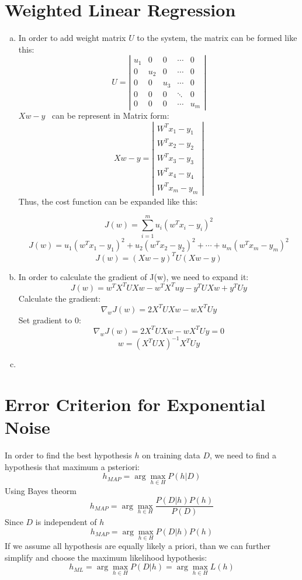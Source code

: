 \documentclass[a4paper, 12pt, titlepage]{article}
\begin{document}
\begin{enumerate}[(a)]
            


\section{Weighted Linear Regression}
\begin{enumerate}[(a)]
    \item In order to add weight matrix $U$ to the system, the matrix can be formed like this:
    \[ U = 
    \left| 
    {\begin{array}{ccccc}
    u_1 & 0 & 0 & \cdots & 0 \\
    0   & u_2 & 0 & \cdots & 0 \\
    0   & 0 & u_3 & \cdots & 0 \\
    0   & 0 & 0 & \ddots & 0 \\
    0   & 0 & 0 & \cdots & u_m
    \end{array}}
    \right|
\]
$Xw-y$~ can be represent in Matrix form:
\[Xw-y=
\left|
{\begin{array}{c}
    W^Tx_1-y_1\\
    W^Tx_2-y_2\\
    W^Tx_3-y_3\\
    W^Tx_4-y_4\\
    W^Tx_m-y_m
\end{array}}
\right|
\]
Thus, the cost function can be expanded like this:

$$J(w)=\sum_{i=1}^mu_i(w^Tx_i-y_i)^2 $$
$$J(w)=u_1(w^Tx_1-y_1)^2+u_2(w^Tx_2-y_2)^2+\cdots+u_m(w^Tx_m-y_m)^2$$
$$J(w)=(Xw-y)^TU(Xw-y)$$
    \item In order to calculate the gradient of J(w), we need to expand it:
        $$J(w)=w^TX^TUXw-w^TX^Tuy-y^TUXw+y^TUy$$
        Calculate the gradient:
        $$\nabla_wJ(w)=2X^TUXw-wX^TUy$$
        Set gradient to 0:
        $$\nabla_wJ(w)=2X^TUXw-wX^TUy=0$$
        $$w=(X^TUX)^{-1}X^TUy$$

\item

\end{enumerate}
\section{Error Criterion for Exponential Noise}

In order to find the best hypothesis $h$ on training data $D$, we need to find a hypothesis that maximum a psteriori:
$$h_{MAP}=\arg\max_{h\in{}H}P(h|D)$$
Using Bayes theorm
$$h_{MAP}=\arg\max_{h\in{}H}\frac{P(D|h)P(h)}{P(D)}$$
Since $D$ is independent of $h$
$$h_{MAP}=\arg\max_{h\in{}H}P(D|h)P(h)$$
If we assume all hypothesis are equally likely a priori, than we can further simplify and choose the maximum likelihood hypothesis:
$$h_{ML}=\arg\max_{h\in{}H}P(D|h)=\arg\max_{h\in{}H}L(h)$$


\end{enumerate}
\end{document}
